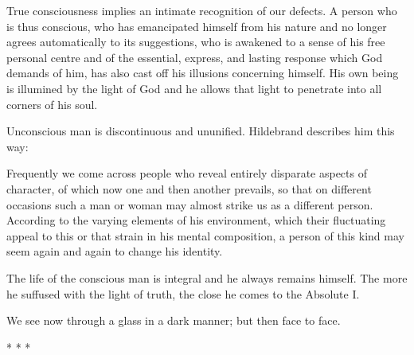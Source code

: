 \begin{quotex}
True consciousness implies an intimate recognition of our defects. A person who is thus conscious, who has emancipated himself from his nature and no longer agrees automatically to its suggestions, who is awakened to a sense of his free personal centre and of the essential, express, and lasting response which God demands of him, has also cast off his illusions concerning himself. His own being is illumined by the light of God and he allows that light to penetrate into all corners of his soul.

\end{quotex}
Unconscious man is discontinuous and ununified. Hildebrand describes him this way:

\begin{quotex}
Frequently we come across people who reveal entirely disparate aspects of character, of which now one and then another prevails, so that on different occasions such a man or woman may almost strike us as a different person. According to the varying elements of his environment, which their fluctuating appeal to this or that strain in his mental composition, a person of this kind may seem again and again to change his identity.

\end{quotex}
The life of the conscious man is integral and he always remains himself. The more he suffused with the light of truth, the close he comes to the Absolute I.

\begin{quotex}
We see now through a glass in a dark manner; but then face to face.

\end{quotex}



\begin{center}* * *\end{center}

